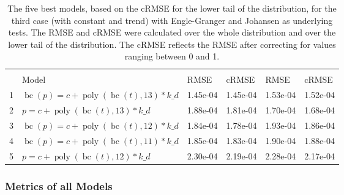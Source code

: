 \documentclass[12pt,a4paper]{article}
\DeclareMathOperator{\bc}{bc}
\DeclareMathOperator{\poly}{poly}
\begin{document}
\begin{table}[!h]

\caption{\label{tab:5_best_e_j_3}\label{tab:best_e_j_3} The five best models, based on the cRMSE for the lower tail of the distribution, for the third case (with constant and trend) with Engle-Granger and Johansen as underlying tests. The RMSE and cRMSE were calculated over the whole distribution and over the lower tail of the distribution. The cRMSE reflects the RMSE after correcting for values ranging between 0 and 1.}
\centering
\fontsize{10}{12}\selectfont
\begin{tabular}[t]{ll>{\raggedleft\arraybackslash}p{2cm}>{\raggedleft\arraybackslash}p{2cm}>{\raggedleft\arraybackslash}p{2cm}>{\raggedleft\arraybackslash}p{2cm}}
\toprule
\multicolumn{1}{c}{\textbf{}} & \multicolumn{1}{c}{\textbf{}} & \multicolumn{2}{c}{\textbf{Full Distribution}} & \multicolumn{2}{c}{\textbf{Lower Tail ($p \leq 0.2$)}} \\
\cmidrule(l{3pt}r{3pt}){3-4} \cmidrule(l{3pt}r{3pt}){5-6}
  & Model & RMSE & cRMSE & RMSE & cRMSE\\
\midrule
\rowcolor{gray!6}  1 & $\bc(p) = c + \poly\left( \bc(t), 13 \right) * k\_d$ & 1.45e-04 & 1.45e-04 & 1.53e-04 & 1.52e-04\\
2 & $p = c + \poly\left( \bc(t), 13 \right) * k\_d$ & 1.88e-04 & 1.81e-04 & 1.70e-04 & 1.68e-04\\
\rowcolor{gray!6}  3 & $\bc(p) = c + \poly\left( \bc(t), 12 \right) * k\_d$ & 1.84e-04 & 1.78e-04 & 1.93e-04 & 1.86e-04\\
4 & $\bc(p) = c + \poly\left( \bc(t), 11 \right) * k\_d$ & 1.85e-04 & 1.83e-04 & 1.90e-04 & 1.88e-04\\
\rowcolor{gray!6}  5 & $p = c + \poly\left( \bc(t), 12 \right) * k\_d$ & 2.30e-04 & 2.19e-04 & 2.28e-04 & 2.17e-04\\
\bottomrule
\end{tabular}
\end{table}

\FloatBarrier

\hypertarget{metrics-of-all-models-1}{%
\subsubsection{Metrics of all Models}\label{metrics-of-all-models-1}}

\begingroup\fontsize{10}{12}\selectfont
\end{document}
